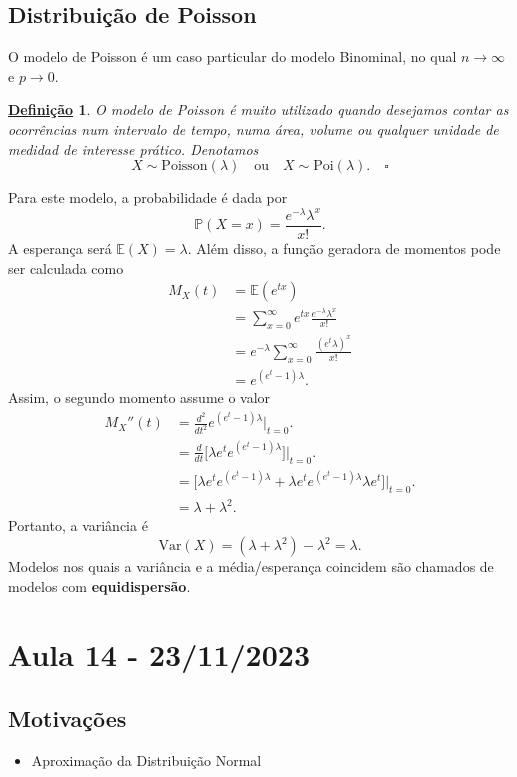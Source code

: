 \documentclass{article}
\newtheorem*{def*}{\underline{Defini\c c\~ao}}
\begin{document}
\subsection{Distribuição de Poisson}
O modelo de Poisson é um caso particular do modelo Binominal, no qual \(n\longrightarrow \infty\) e \(p\longrightarrow 0\).
\begin{def*}
  O modelo de Poisson é muito utilizado quando desejamos contar as ocorrências num intervalo de tempo, numa área, volume ou qualquer unidade
  de medidad de interesse prático. Denotamos 
  \[
    X\sim \mathrm{Poisson}(\lambda )\quad \text{ou}\quad X\sim \mathrm{Poi}(\lambda ).\quad\square
  \]
\end{def*}
Para este modelo, a probabilidade é dada por 
\[
  \mathbb{P}(X=x) = \frac{e^{-\lambda }\lambda^{x}}{x!}.
\]
A esperança será \(\mathbb{E}(X) = \lambda \). Além disso, a função geradora de momentos pode ser calculada como 
\begin{align*}
  M_{X}(t) &= \mathbb{E}(e^{tx})\\
           &= \sum\limits_{x=0}^{\infty}e^{tx}\frac{e^{-\lambda }\lambda ^{x}}{x!}\\
           &= e^{-\lambda }\sum\limits_{x=0}^{\infty}\frac{(e^{t}\lambda)^{x}}{x!}\\
           &= e^{(e^{t}-1)\lambda }.
\end{align*}
Assim, o segundo momento assume o valor 
\begin{align*}
  M_{X}''(t) &= \frac{d^{2}}{dt^{2}}e^{(e^{t}-1)\lambda }\biggl|_{t=0}^{}\biggr. \\
             &= \frac{d}{dt}\biggl[\lambda e^{t}e^{(e^{t}-1)\lambda }\biggr]\biggl|_{t=0}^{}\biggr.\\
             &= \biggl[\lambda e^{t}e^{(e^{t}-1)\lambda } + \lambda e^{t}e^{(e^{t}-1)\lambda }\lambda e^{t}\biggr]\biggl|_{t=0}^{}\biggr.\\
             &= \lambda + \lambda^{2}.
\end{align*}
Portanto, a variância é 
\[
  \mathrm{Var}(X) = (\lambda + \lambda^{2})-\lambda^{2} = \lambda .
\] 
Modelos nos quais a variância e a média/esperança coincidem são chamados de modelos com \textbf{equidispersão}.
\newpage

\section{Aula 14 - 23/11/2023}
\subsection{Motivações} 
\begin{itemize}
  \item Aproximação da Distribuição Normal
\end{itemize}
\end{document}
